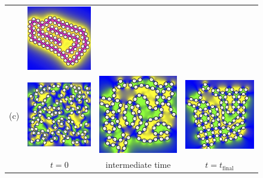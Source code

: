 \begin{figure}[h!]
\begin{center}
\begin{tabular}{m{0.1cm}m{1.9in}m{1.9in}m{1.9in}}
      &\includegraphics[width=1.9in]{figures/SpecificAim1/N100C3.jpg}    \\
    (c)
      &\includegraphics[width=1.9in]{figures/SpecificAim1/N100A1.jpg}
      &\includegraphics[width=1.9in]{figures/SpecificAim1/N100A2.jpg}
      &\includegraphics[width=1.9in]{figures/SpecificAim1/N100A3.jpg}    \\
      &\multicolumn{1}{c}{$t = 0$}
      &\multicolumn{1}{c}{intermediate time}
      &\multicolumn{1}{c}{$t = t_{\text{final}}$}
  \end{tabular}
  \end{center}
  \vspace{-20pt}

\end{figure}
